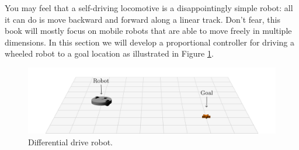 \newcommand{\drawdiffrobot}[4]{
\begin{scope}[shift={(#1,#2)},rotate=#3,scale=#4]
\draw (0,0) circle (1);
\draw[thick,->] (0,0) -- (.7,0);
\drawwheel{0}{.7}
\drawwheel{0}{-.7}
\end{scope}
}




You may feel that a self-driving locomotive is a disappointingly
simple robot: all it can do is move backward and forward along a
linear track.  Don't fear, this book will mostly focus on mobile
robots that are able to move freely in multiple dimensions.  In this
section we will develop a proportional controller for driving a wheeled
robot to a goal location as illustrated in Figure
\ref{fig:diff_robot}.



\begin{figure}[h]
\begin{center}
\includegraphics{pid/figs/3drobot.png}
\end{center}
\caption{Differential drive robot.}
\label{fig:diff_robot}
\end{figure}










